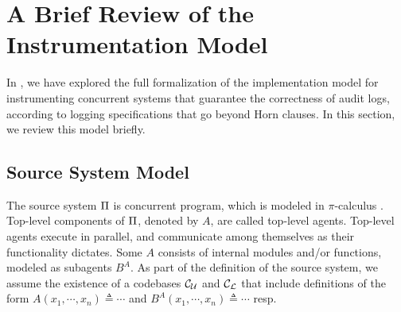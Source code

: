 \section{A Brief Review of the Instrumentation Model} \label{sec:implmodel}

In \cite{X}, we have explored the full formalization of the implementation model for instrumenting concurrent systems that guarantee the correctness of audit logs, according to logging specifications that go beyond Horn clauses. In this section, we review this model briefly. 

\subsection{Source System Model} \label{sec:pi}

The source system $\Pi$ is concurrent program, which is modeled in $\pi$-calculus \cite{parrow2001introduction}. Top-level components of $\Pi$, denoted by $A$, are called top-level agents. Top-level agents execute in parallel, and communicate among themselves as their functionality dictates. Some $A$ consists of internal modules and/or functions, modeled as subagents $B^A$. As part of the definition of the source system, we assume the existence of a codebases $\mathcal{C}_\mathcal{U}$ and $\mathcal{C}_\mathcal{L}$ that include definitions of the form $A(x_1, \cdots, x_n) \triangleq \cdots$ and $B^A (x_1, \cdots, x_n) \triangleq \cdots$ resp.



